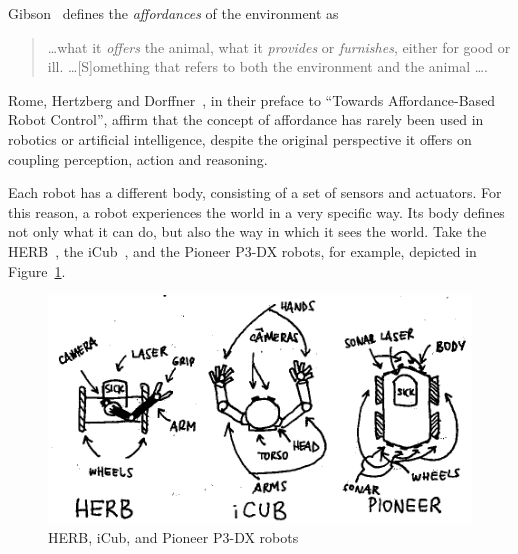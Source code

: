 \documentclass{article}
\begin{document}
Gibson~\cite{gibson1979} defines the \emph{affordances} of the environment as

\begin{quotation}
  \dots what it \emph{offers} the animal, what it \emph{provides} or
  \emph{furnishes}, either for good or ill. \dots [S]omething that refers to
  both the environment and the animal \dots.
\end{quotation}

Rome, Hertzberg and Dorffner~\cite{rome2008}, in their preface to ``Towards
Affordance-Based Robot Control'', affirm that the concept of affordance has
rarely been used in robotics or artificial intelligence, despite the original
perspective it offers on coupling perception, action and reasoning.


Each robot has a different body, consisting of a set of sensors and actuators. 
For this reason, a robot experiences the world in a very specific way. Its body
defines not only what it can do, but also the way in which it sees the world.
Take the HERB~\cite{srinivasa2009herb}, the iCub~\cite{metta2010icub}, and the
Pioneer P3-DX robots, for example, depicted in
Figure~\ref{fig:herb_icub_pioneer}.

\begin{figure}[h]
  \centering
  \includegraphics{figures/herb_icub_pioneer.png}
  \caption{HERB, iCub, and Pioneer P3-DX robots}
  \label{fig:herb_icub_pioneer}
\end{figure}
\end{document}

